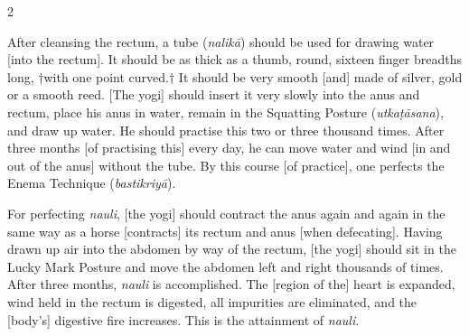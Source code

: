 \begin{nohyp}
\begin{multicols}{2}
\begin{eng}

After cleansing the rectum, a tube (\textit{nalikā}) should be used for drawing water [into the rectum].  It should be as thick as a thumb, round, sixteen finger breadths long, $\dagger$with one point curved.$\dagger$  It should be very smooth [and] made of silver, gold or a smooth reed. [The yogi] should insert it very slowly into the anus and rectum, place his anus in water, remain in the Squatting Posture (\textit{utkaṭāsana}), and draw up water. He should practise this two or three thousand times. After three months [of practising this] every day, he can move water and wind [in and out of the anus] without the tube. By this course [of practice], one perfects the Enema Technique (\textit{bastikriyā}).
\vskip 7pt


For perfecting \textit{nauli}, [the yogi] should contract the anus again and again in the same way as a horse [contracts] its rectum and anus [when defecating]. Having drawn up air into the abdomen by way of the rectum, [the yogi] should sit in the Lucky Mark Posture and move the abdomen left and right thousands of times. After three months, \textit{nauli} is accomplished. The [region of the] heart is expanded, wind held in the rectum is digested, all impurities are eliminated, and the [body’s] digestive fire increases. This is the attainment of \textit{nauli}.
\end{eng}
\end{multicols}
\end{nohyp}
\newpage

\null\vspace{0.1cm}

\begin{kan}
\end{kan}



